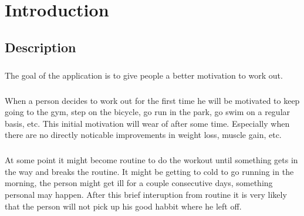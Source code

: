 \chapter{Introduction}
	\section{Description}
		\paragraph{}
			The goal of the application is to give people a better motivation to work out. 
		\paragraph{}
			When a person decides to work out for the first time he will be motivated to keep going to the gym, step on the bicycle, go run in the park, go swim on a regular basis, etc. This initial motivation will wear of after some time. Especially when there are no directly noticable improvements in weight loss, muscle gain, etc.
		\paragraph{}
			At some point it might become routine to do the workout until something gets in the way and breaks the routine. It might be getting to cold to go running in the morning, the person might get ill for a couple consecutive days, something personal may happen. After this brief interuption from routine it is very likely that the person will not pick up his good habbit where he left off.
		\paragraph{}
			
